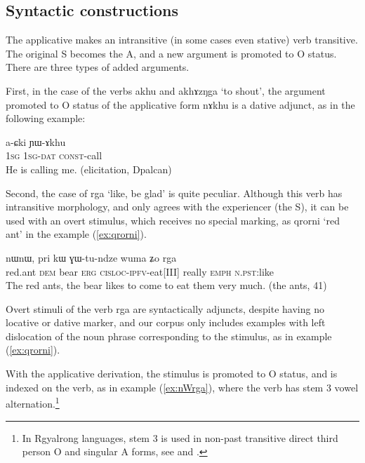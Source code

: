 \documentclass[oldfontcommands,twoside,a4paper,12pt]{article}
\newcommand{\ipa}[1]{{\phon \mbox{#1}}} %
\begin{document}
 
\subsection{Syntactic constructions} \label{subsub:appl.syntax}
The applicative makes an intransitive (in some cases even stative) verb transitive. The original S becomes the A, and a new argument is promoted to O status. There are three types of added arguments.

First, in the case of the verbs \ipa{akhu} and \ipa{akhɤzŋga} `to shout', the  argument promoted to O status of the applicative form \ipa{nɤkhu} is a   dative adjunct, as in the following example:

\begin{exe}
   \ex 
\gll   \ipa{aʑo} \ipa{a-ɕki} \ipa{ɲɯ-ɤkhu} \\
\textsc{1sg}     \textsc{1sg-dat} \textsc{const}-call\\
 \glt  He is calling me. (elicitation, Dpalcan)
   \end{exe} 

Second, the case of \ipa{rga} `like, be glad' is quite peculiar. Although this verb has intransitive morphology, and only agrees with the experiencer (the S), it can be used with an overt stimulus, which receives no special marking, as \ipa{qrorni} `red ant' in the example (\ref{ex:qrorni}).

\begin{exe}
   \ex \label{ex:qrorni}
\gll \ipa{qrorni}  	\ipa{nɯnɯ,}  	\ipa{pri}  	\ipa{kɯ}  	\ipa{ɣɯ-tu-ndze}  	\ipa{wuma}  	\ipa{ʑo}  	\ipa{rga}  	 \\
red.ant \textsc{dem} bear \textsc{erg} \textsc{cisloc-ipfv}-eat[III] really \textsc{emph} \textsc{n.pst}:like \\
 \glt  The red ants, the bear likes to come to eat them very much. (the ants, 41)
   \end{exe} 
   
 Overt stimuli of the verb \ipa{rga} are syntactically adjuncts, despite having no locative or dative marker, and our corpus only includes examples with left dislocation of the noun phrase corresponding to the stimulus, as in example (\ref{ex:qrorni}).
 

With the applicative derivation, the stimulus is promoted to O status, and is indexed on the verb, as in example (\ref{ex:nWrga}), where the verb has stem 3 vowel alternation.\footnote{In Rgyalrong languages, stem 3 is used in non-past transitive direct third person O and singular A forms, see \citet{jackson00puxi} and  \citet{jacques12incorp}.}
 
\end{document}
